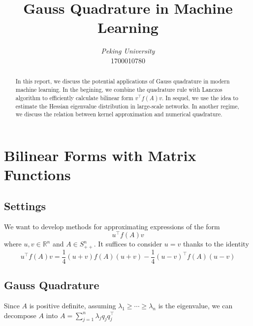 \documentclass[conference]{IEEEtran}
\newcommand{\R}{\mathbb{R}}
\DeclareMathOperator{\1}{\mathbf{1}}
\theoremstyle{definition}
\begin{document}
\title{Gauss Quadrature in Machine Learning\\
}

\author{
\textit{Peking University}\\
1700010780}

\maketitle
\begin{abstract}
    In this report, we discuss the potential applications of Gauss quadrature in modern machine learning. In the begining, we combine the quadrature rule with Lanczos algorithm to efficiently calculate bilinear form $v^\top f(A)v$. In sequel, we use the idea to estimate the Hessian eigenvalue distribution in large-scale networks. In another regime, we discuss the relation between kernel approximation and numerical quadrature.
\end{abstract}

\section{Bilinear Forms with Matrix Functions}
\subsection{Settings}
We want to develop methods for approximating expressions of the form
\begin{equation}
    u^\top f(A) v
\end{equation}
where $u, v\in \R^n$ and $A\in S_{++}^n$. It suffices to consider $u=v$ thanks to the identity
\begin{equation*}
    u^\top f(A) v = \frac{1}{4} (u+v)f(A)(u+v)-\frac{1}{4}(u-v)^\top f(A)(u-v)
\end{equation*}
\subsection{Gauss Quadrature}
Since $A$ is positive definite, assuming $\lambda_1\geq\cdots\geq\lambda_n$ is the eigenvalue, we can decompose $A$ into
$A = \sum_{j=1}^n \lambda_j q_j q_j^\top$
\end{document}
